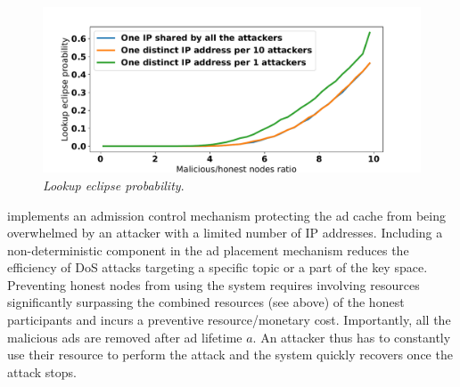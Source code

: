 \begin{figure}[t]
    \includegraphics[width=1\linewidth]{img/eclipse_probability}
    \vspace{-0.1in}
    \caption{\emph{Lookup eclipse probability}.
    }
    \label{fig:eclipse_probability}
    \vspace{-0.1in}
\end{figure}

\sysname implements an admission control mechanism protecting the ad cache from being overwhelmed by an attacker with a limited number of IP addresses.
Including a non-deterministic component in the ad placement mechanism reduces the efficiency of DoS attacks targeting a specific topic or a part of the key space.
Preventing honest nodes from using the system requires involving resources significantly surpassing the combined resources (see above) of the honest participants and incurs a preventive resource/monetary cost.
Importantly, all the malicious ads are removed after ad lifetime $a$.
An attacker thus has to constantly use their resource to perform the attack and the system quickly recovers once the attack stops.
